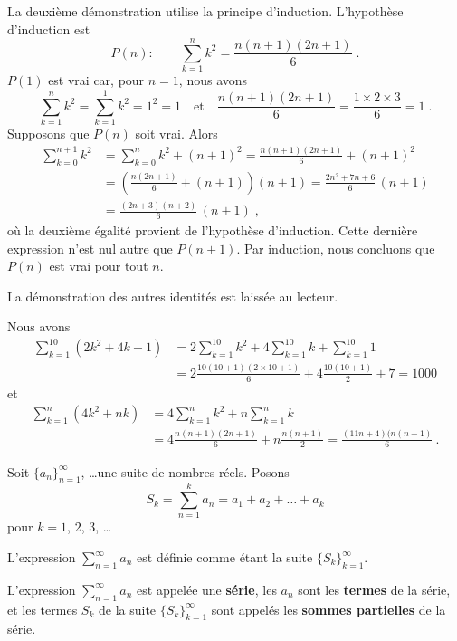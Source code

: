 {\begin{rmk}[\theory]
 La deuxième démonstration utilise la principe d'induction.
L'hypothèse d'induction est
\[
P(n) : \qquad \sum_{k=1}^n k^2 = \frac{n(n+1)(2n+1)}{6} \; .
\]
$P(1)$ est vrai car, pour $n=1$, nous avons
\[
\sum_{k=1}^n k^2 = \sum_{k=1}^1 k^2 = 1^2 = 1 \quad \text{et} \quad
\frac{n(n+1)(2n+1)}{6} = \frac{1 \times 2 \times 3}{6} = 1 \; .
\]
Supposons que $P(n)$ soit vrai.  Alors
\begin{align*}
\sum_{k=0}^{n+1} k^2 &= \sum_{k=0}^n k^2 + (n+1)^2
= \frac{n(n+1)(2n+1)}{6} + (n+1)^2 \\
&= \left(\frac{n(2n+1)}{6} + (n+1)\right) (n+1)
= \frac{2n^2 + 7n + 6}{6}\,(n+1) \\
&= \frac{(2n+3)(n+2)}{6}\,(n+1) \; ,
\end{align*}
où la deuxième égalité provient de l'hypothèse d'induction.  Cette
dernière expression n'est nul autre que $P(n+1)$.  Par induction, nous
concluons que $P(n)$ est vrai pour tout $n$.

La démonstration des autres identités est laissée au lecteur. 
\end{rmk}

\begin{egg}[\theory]
Nous avons
\begin{align*}
\sum_{k=1}^{10} (2k^2 + 4 k + 1) &= 
2\sum_{k=1}^{10} k^2 + 4 \sum_{k=1}^{10} k + \sum_{k=1}^{10} 1 \\
&= 2 \frac{10(10+1)(2\times 10 +1)}{6} + 4 \frac{10(10+1)}{2} + 7
= 1000
\end{align*}
et
\begin{align*}
\sum_{k=1}^n (4k^2 + n k) &= 4\sum_{k=1}^n k^2 + n \sum_{k=1}^n k \\
&= 4 \frac{n(n+1)(2n+1)}{6} + n \frac{n(n+1)}{2}
= \frac{(11n+4)(n(n+1)}{6} \ .
\end{align*}
\end{egg}

\begin{defn}
Soit $\{ a_n\}_{n=1}^\infty$, \ldots une suite de nombres réels.  Posons
\[
S_k = \sum_{n=1}^k a_n = a_1 + a_2 + \ldots + a_k
\]
pour $k=1$, $2$, $3$, \ldots

L'expression $\displaystyle \sum_{n=1}^\infty a_n$ est définie comme
étant la suite $\{S_k\}_{k=1}^\infty$.

L'expression $\displaystyle \sum_{n=1}^\infty a_n$ est appelée une
{\bfseries série}, les $a_n$ sont les
{\bfseries termes} de la série, et les termes
$S_k$ de la suite $\displaystyle \{S_k\}_{k=1}^\infty$ sont appelés
les {\bfseries sommes partielles} de la
série.


\end{defn}}
